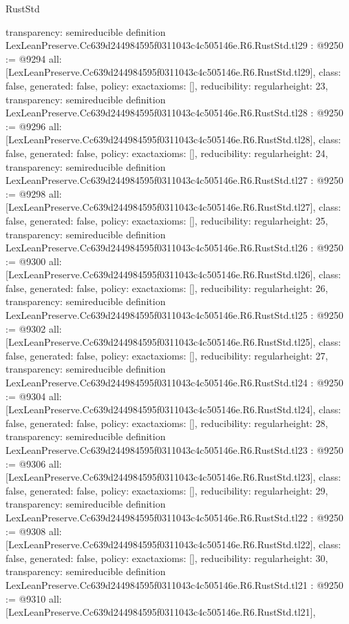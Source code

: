 \begin{lexlean}{RustStd}
\begin{coremodule}
{  transparency: semireducible
}
definition LexLeanPreserve.Cc639d244984595f0311043c4c505146e.R6.RustStd.tl29 : @9250 := @9294 {
  all: [LexLeanPreserve.Cc639d244984595f0311043c4c505146e.R6.RustStd.tl29],
  class: false,
  generated: false,
  policy: exact{axioms: []},
  reducibility: regular{height: 23},
  transparency: semireducible
}
definition LexLeanPreserve.Cc639d244984595f0311043c4c505146e.R6.RustStd.tl28 : @9250 := @9296 {
  all: [LexLeanPreserve.Cc639d244984595f0311043c4c505146e.R6.RustStd.tl28],
  class: false,
  generated: false,
  policy: exact{axioms: []},
  reducibility: regular{height: 24},
  transparency: semireducible
}
definition LexLeanPreserve.Cc639d244984595f0311043c4c505146e.R6.RustStd.tl27 : @9250 := @9298 {
  all: [LexLeanPreserve.Cc639d244984595f0311043c4c505146e.R6.RustStd.tl27],
  class: false,
  generated: false,
  policy: exact{axioms: []},
  reducibility: regular{height: 25},
  transparency: semireducible
}
definition LexLeanPreserve.Cc639d244984595f0311043c4c505146e.R6.RustStd.tl26 : @9250 := @9300 {
  all: [LexLeanPreserve.Cc639d244984595f0311043c4c505146e.R6.RustStd.tl26],
  class: false,
  generated: false,
  policy: exact{axioms: []},
  reducibility: regular{height: 26},
  transparency: semireducible
}
definition LexLeanPreserve.Cc639d244984595f0311043c4c505146e.R6.RustStd.tl25 : @9250 := @9302 {
  all: [LexLeanPreserve.Cc639d244984595f0311043c4c505146e.R6.RustStd.tl25],
  class: false,
  generated: false,
  policy: exact{axioms: []},
  reducibility: regular{height: 27},
  transparency: semireducible
}
definition LexLeanPreserve.Cc639d244984595f0311043c4c505146e.R6.RustStd.tl24 : @9250 := @9304 {
  all: [LexLeanPreserve.Cc639d244984595f0311043c4c505146e.R6.RustStd.tl24],
  class: false,
  generated: false,
  policy: exact{axioms: []},
  reducibility: regular{height: 28},
  transparency: semireducible
}
definition LexLeanPreserve.Cc639d244984595f0311043c4c505146e.R6.RustStd.tl23 : @9250 := @9306 {
  all: [LexLeanPreserve.Cc639d244984595f0311043c4c505146e.R6.RustStd.tl23],
  class: false,
  generated: false,
  policy: exact{axioms: []},
  reducibility: regular{height: 29},
  transparency: semireducible
}
definition LexLeanPreserve.Cc639d244984595f0311043c4c505146e.R6.RustStd.tl22 : @9250 := @9308 {
  all: [LexLeanPreserve.Cc639d244984595f0311043c4c505146e.R6.RustStd.tl22],
  class: false,
  generated: false,
  policy: exact{axioms: []},
  reducibility: regular{height: 30},
  transparency: semireducible
}
definition LexLeanPreserve.Cc639d244984595f0311043c4c505146e.R6.RustStd.tl21 : @9250 := @9310 {
  all: [LexLeanPreserve.Cc639d244984595f0311043c4c505146e.R6.RustStd.tl21],
}
\end{coremodule}
\end{lexlean}
